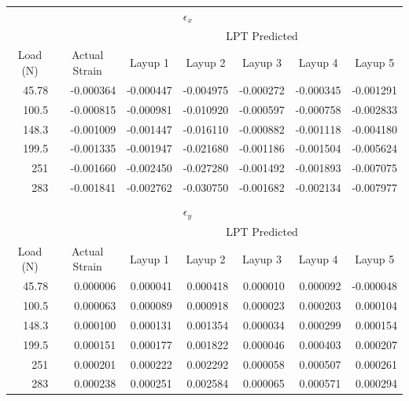 \documentclass[12pt]{article}
\begin{document}
\begin{table}[htbp]
	\centering
	\begin{tabular}{rrrrrrr}
		&       &       & \multicolumn{1}{l}{$\epsilon_x$} &       &       &  \\
		&       & \multicolumn{5}{c}{LPT Predicted} \\
		\cmidrule{3-7}    \multicolumn{1}{c}{Load (N)} & \multicolumn{1}{c}{Actual Strain} & \multicolumn{1}{c}{Layup 1} & \multicolumn{1}{c}{Layup 2} & \multicolumn{1}{c}{Layup 3} & \multicolumn{1}{c}{Layup 4} & \multicolumn{1}{c}{Layup 5} \\
		45.78 & -0.000364 & -0.000447 & -0.004975 & -0.000272 & -0.000345 & -0.001291 \\
		100.5 & -0.000815 & -0.000981 & -0.010920 & -0.000597 & -0.000758 & -0.002833 \\
		148.3 & -0.001009 & -0.001447 & -0.016110 & -0.000882 & -0.001118 & -0.004180 \\
		199.5 & -0.001335 & -0.001947 & -0.021680 & -0.001186 & -0.001504 & -0.005624 \\
		251   & -0.001660 & -0.002450 & -0.027280 & -0.001492 & -0.001893 & -0.007075 \\
		283   & -0.001841 & -0.002762 & -0.030750 & -0.001682 & -0.002134 & -0.007977 \\
		&       &       &       &       &       &  \\
		&       &       & \multicolumn{1}{l}{$\epsilon_y$} &       &       &  \\
		&       & \multicolumn{5}{c}{LPT Predicted} \\
		\cmidrule{3-7}    \multicolumn{1}{c}{Load (N)} & \multicolumn{1}{c}{Actual Strain} & \multicolumn{1}{c}{Layup 1} & \multicolumn{1}{c}{Layup 2} & \multicolumn{1}{c}{Layup 3} & \multicolumn{1}{c}{Layup 4} & \multicolumn{1}{c}{Layup 5} \\
		45.78 & 0.000006 & 0.000041 & 0.000418 & 0.000010 & 0.000092 & -0.000048 \\
		100.5 & 0.000063 & 0.000089 & 0.000918 & 0.000023 & 0.000203 & 0.000104 \\
		148.3 & 0.000100 & 0.000131 & 0.001354 & 0.000034 & 0.000299 & 0.000154 \\
		199.5 & 0.000151 & 0.000177 & 0.001822 & 0.000046 & 0.000403 & 0.000207 \\
		251   & 0.000201 & 0.000222 & 0.002292 & 0.000058 & 0.000507 & 0.000261 \\
		283   & 0.000238 & 0.000251 & 0.002584 & 0.000065 & 0.000571 & 0.000294 \\

\end{tabular}
\end{table}
\end{document}
